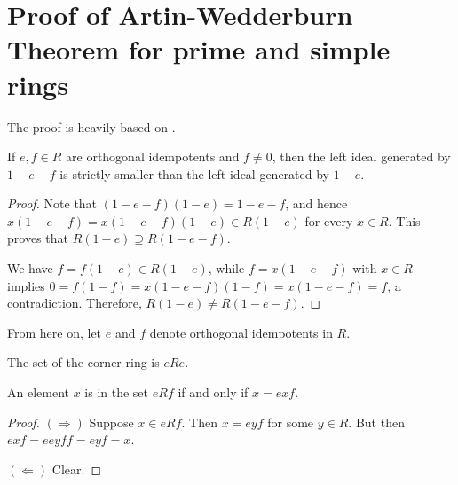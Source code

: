 \section{Proof of Artin-Wedderburn Theorem for prime and simple rings}
The proof is heavily based on \cite{bresar2024wedderburnartintheorem}.
\begin{theorem}
  \label{thm:one_sub_e_larger_span_on_sub_e_sub_f}
  \leanok
  If $e, f \in R$ are orthogonal idempotents and $f \neq 0$, then the left ideal generated by $1 - e - f$ is strictly smaller than the left ideal generated by $1 - e$.
\end{theorem}
\begin{proof}
  \leanok
  Note that $(1 - e - f)(1 - e) = 1 - e - f$, and hence
  $x(1 - e - f) = x(1 - e - f)(1 - e) \in R(1 - e)$
  for every $x \in R$. This proves that $R(1 - e) \supseteq R(1 - e - f)$.

  We have $f = f(1 - e) \in R(1 - e)$, while $f = x(1 - e - f)$ with $x \in R$ implies
  $0 = f(1 - f) = x(1 - e - f)(1 - f) = x(1 - e - f) = f$,
  a contradiction. Therefore, $R(1 - e) \neq R(1 - e - f)$.
\end{proof}

From here on, let $e$ and $f$ denote orthogonal idempotents in $R$.

\begin{definition}
  \label{def:corner_ring}
  The set of the corner ring is $eRe$.
\end{definition}

\begin{theorem}
  \label{thm:characterization_of_corner_elements}
  \leanok
  An element $x$ is in the set $e R f$ if and only if $x = e x f$.
\end{theorem}
\begin{proof}
  \leanok
  $(\Rightarrow)$ Suppose $x \in e R f$. Then $x = e y f$ for some $y \in R$. But then $e x f = e e y f f = e y f = x$.

  $(\Leftarrow)$ Clear.
\end{proof}


